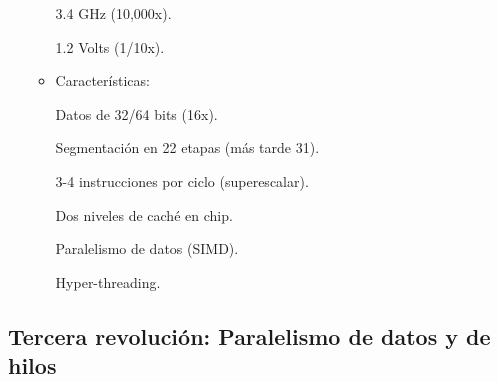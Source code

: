 \documentclass[12pt, twoside, openright]{report} %
\begin{document}
\begin{itemize}
\begin{itemize}
      3.4 GHz (10,000x).

      1.2 Volts (1/10x).

        \item Características:
        
      Datos de 32/64 bits (16x).

      Segmentación en 22 etapas (más tarde 31).

      3-4 instrucciones por ciclo (superescalar).

      Dos niveles de caché en chip.

      Paralelismo de datos (SIMD).

      Hyper-threading.
      \end{itemize}
 \end{itemize}
    
    \subsection{Tercera revolución: Paralelismo de datos y de hilos}
\end{document}
